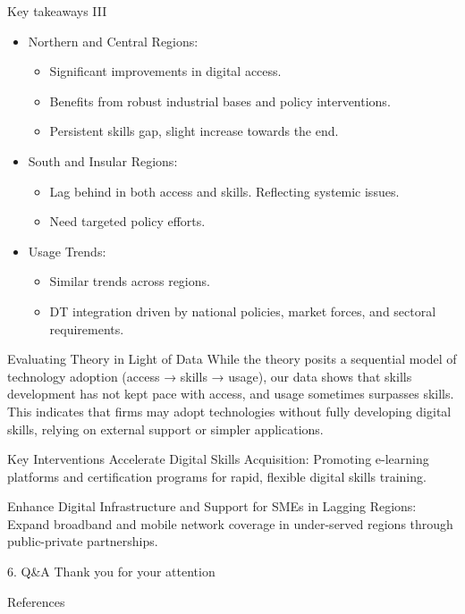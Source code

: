 \documentclass[
  ignorenonframetext,
]{beamer}
\newif\ifbibliography
\providecommand{\tightlist}{%
  \setlength{\itemsep}{0pt}\setlength{\parskip}{0pt}}
\begin{document}
\begin{frame}{Key takeaways III}
\label{key-takeaways-iii}
\begin{itemize}
\item
  Northern and Central Regions:

  \begin{itemize}
  \tightlist
  \item
    Significant improvements in digital access.
  \item
    Benefits from robust industrial bases and policy interventions.
  \item
    Persistent skills gap, slight increase towards the end.
  \end{itemize}
\item
  South and Insular Regions:

  \begin{itemize}
  \tightlist
  \item
    Lag behind in both access and skills. Reflecting systemic issues.
  \item
    Need targeted policy efforts.
  \end{itemize}
\item
  Usage Trends:

  \begin{itemize}
  \tightlist
  \item
    Similar trends across regions.
  \item
    DT integration driven by national policies, market forces, and
    sectoral requirements.
  \end{itemize}
\end{itemize}
\end{frame}

\begin{frame}{Evaluating Theory in Light of Data}
\label{evaluating-theory-in-light-of-data}
While the theory posits a sequential model of technology adoption
(access → skills → usage), our data shows that skills development has
not kept pace with access, and usage sometimes surpasses skills. This
indicates that firms may adopt technologies without fully developing
digital skills, relying on external support or simpler applications.
\end{frame}

\begin{frame}{Key Interventions}
\label{key-interventions}
Accelerate Digital Skills Acquisition: Promoting e-learning platforms
and certification programs for rapid, flexible digital skills training.

Enhance Digital Infrastructure and Support for SMEs in Lagging Regions:
Expand broadband and mobile network coverage in under-served regions
through public-private partnerships.
\end{frame}

\begin{frame}{6. Q\&A}
\label{qa}
Thank you for your attention
\end{frame}

\renewcommand\refname{References}
\begin{frame}[allowframebreaks]{References}
  \bibliographytrue
  
\end{frame}
\end{document}
